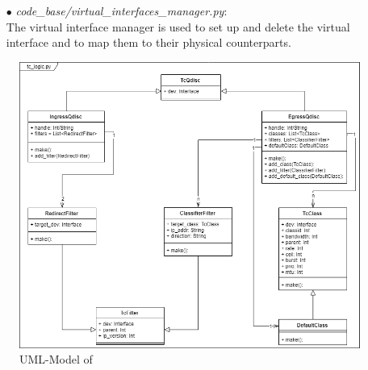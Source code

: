 \begin{enumerate}
\item[$\bullet$]\textit{code\_base/virtual\_interfaces\_manager.py}:
\\
The virtual interface manager is used to set up and delete the virtual interface and to map them to their physical counterparts.

\end{enumerate}

\begin{figure}[h]
	\centering
  	\includegraphics[width=\textwidth]{img/tc_logic_uml.png}
    \caption{UML-Model of }
    \label{tc logic uml}
\end{figure}
